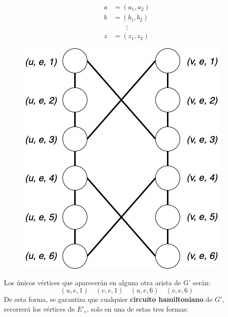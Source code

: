 \documentclass[a4paper]{article}
\begin{document}
\begin{align*}
 a &= (a_1, a_2) \\
 b &= (b_1, b_2) \\
 &\phantom{b=\,} \vdots \\
 z &= (z_1, z_2)
\end{align*}
\begin{figure}[ht]
        \centering
        \includegraphics[scale=0.25]{images/cover-testing-2.png}
        \label{fig:my_label}
    \end{figure}
Los únicos vértices que aparecerán en alguna otra arista de G' serán:
\[(u,e,1) \quad (v,e,1) \quad (u,e,6) \quad (v,e,6)\]
De esta forma, se garantiza que cualquier \textbf{circuito hamiltoniano} de $G'$, recorrerá los vértices de $E'_e$, solo en una de estas tres formas:
\end{document}
